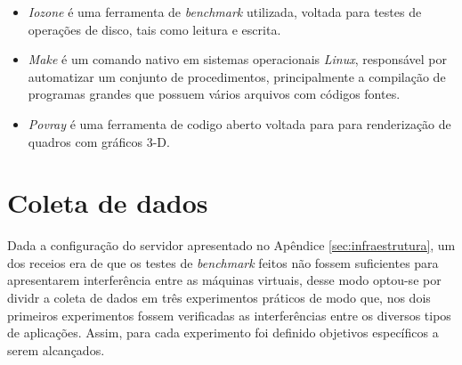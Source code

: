 \begin{itemize}
\item \textit{Iozone} \footnotemark[8] é uma ferramenta de \textit{benchmark} utilizada, voltada para testes de operações de disco, tais como leitura e escrita.

\item \textit{Make} é um comando nativo em sistemas operacionais \textit{Linux}, responsável por automatizar um conjunto de procedimentos, principalmente  a compilação de programas grandes que possuem vários arquivos com códigos fontes. 

\item \textit{Povray} \footnotemark[9] é uma ferramenta de codigo aberto voltada para para renderização de quadros com gráficos 3-D.

\end{itemize}



\section{Coleta de dados} 
Dada a configuração do servidor apresentado no Apêndice \ref{sec:infraestrutura}, um dos receios era de que os testes de \textit{benchmark} feitos não fossem suficientes para apresentarem interferência entre as máquinas virtuais, desse modo optou-se por dividr a coleta de dados em três experimentos práticos de modo que, nos dois primeiros experimentos fossem verificadas as interferências entre os diversos tipos de aplicações. Assim, para cada experimento foi definido objetivos específicos a serem alcançados.

